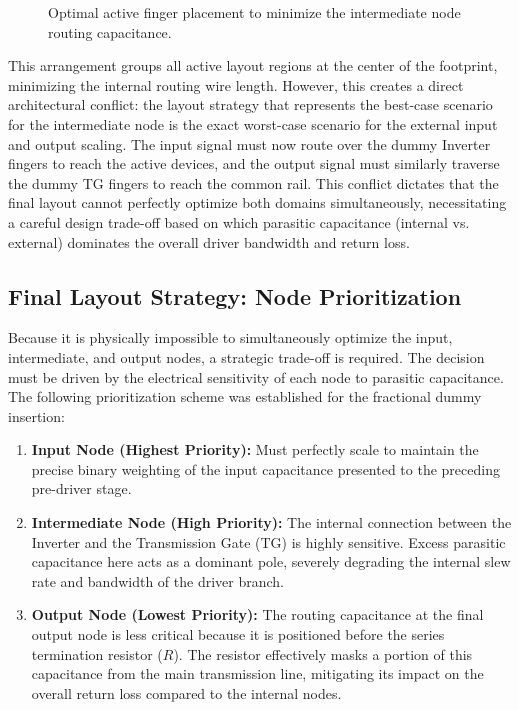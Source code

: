 \begin{figure}[H]
    \caption{Optimal active finger placement to minimize the intermediate node routing capacitance.}
    \label{fig:intermediate_node}
\end{figure}

This arrangement groups all active layout regions at the center of the footprint, minimizing the internal routing wire length. However, this creates a direct architectural conflict: the layout strategy that represents the best-case scenario for the intermediate node is the exact worst-case scenario for the external input and output scaling. The input signal must now route over the dummy Inverter fingers to reach the active devices, and the output signal must similarly traverse the dummy TG fingers to reach the common rail. This conflict dictates that the final layout cannot perfectly optimize both domains simultaneously, necessitating a careful design trade-off based on which parasitic capacitance (internal vs. external) dominates the overall driver bandwidth and return loss.
\subsection*{Final Layout Strategy: Node Prioritization}
Because it is physically impossible to simultaneously optimize the input, intermediate, and output nodes, a strategic trade-off is required. The decision must be driven by the electrical sensitivity of each node to parasitic capacitance. The following prioritization scheme was established for the fractional dummy insertion:

\begin{enumerate}
    \item \textbf{Input Node (Highest Priority):} Must perfectly scale to maintain the precise binary weighting of the input capacitance presented to the preceding pre-driver stage.
    \item \textbf{Intermediate Node (High Priority):} The internal connection between the Inverter and the Transmission Gate (TG) is highly sensitive. Excess parasitic capacitance here acts as a dominant pole, severely degrading the internal slew rate and bandwidth of the driver branch.
    \item \textbf{Output Node (Lowest Priority):} The routing capacitance at the final output node is less critical because it is positioned before the series termination resistor ($R$). The resistor effectively masks a portion of this capacitance from the main transmission line, mitigating its impact on the overall return loss compared to the internal nodes.
\end{enumerate}

